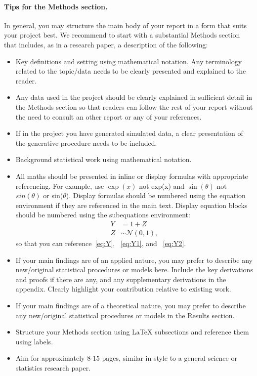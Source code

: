 \documentclass{statsmsc}
\begin{document}
\paragraph{Tips for the Methods section.} In general, you may structure the main body of your report in a form that suits your project best. We recommend to start with a substantial Methods section that includes, as in a research paper, a description of the following:
\begin{itemize}
    \item Key definitions and setting using mathematical notation. Any terminology related to the topic/data needs to be clearly presented and explained to the reader.
    \item Any data used in the project should be clearly explained in sufficient detail in the Methods section so that readers can follow the rest of your report without the need to consult an other report or any of your references.
    \item If in the project you have generated simulated data, a clear presentation of the generative procedure needs to be included. 
    \item Background statistical work using mathematical notation.
    \item All maths should be presented in inline or display formulas with appropriate referencing. For example, use $\exp(x)$ not exp(x) and $\sin(\theta)$ not $sin(\theta)$ or sin($\theta$). Display formulas should be numbered using the equation environment if they are referenced in the main text. Display equation blocks should be numbered using the subequations environment:
\begin{subequations}\label{eq:Y}
    \begin{align}
        Y & = 1 + Z \label{eq:Y1} \\ 
        Z & \sim \mathcal{N}(0,1) \label{eq:Y2},
    \end{align}
\end{subequations}
    so that you can reference~\eqref{eq:Y}, ~\eqref{eq:Y1}, and ~\eqref{eq:Y2}.
    \item If your main findings are of an applied nature, you may prefer to describe any new/original statistical procedures or models here. Include the key derivations and proofs if there are any, and any supplementary derivations in the appendix. Clearly highlight your contribution relative to existing work. 
    \item If your main findings are of a theoretical nature, you may prefer to describe any new/original statistical procedures or models in the Results section.
    \item Structure your Methods section using LaTeX   subsections and reference them using labels.
    \item Aim for approximately 8-15 pages, similar in style to a general science or statistics research paper.
\end{itemize}
\end{document}
